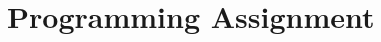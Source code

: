 \begin{enumerate}
\begin{enumerate}
\end{enumerate}



\end{enumerate}

\section{Programming Assignment}



